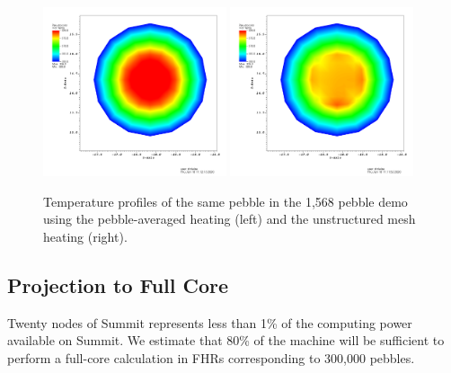 \begin{figure}[!h]
\centering
\includegraphics[clip=true,width=0.48\textwidth]{Figures/openmc_cell_temperature_zoomed}
\includegraphics[clip=true,width=0.48\textwidth]{Figures/openmc_mesh_temperature_zoomed}
\caption{Temperature profiles of the same pebble in the 1,568 pebble demo using the pebble-averaged heating (left) and the unstructured mesh heating (right).}
\label{f:1568_openmc_temperatures_single_pebble}
\end{figure}

\subsection{Projection to Full Core}

Twenty nodes of Summit represents less than 1\% of the computing power available on Summit. We estimate that 80\% of the machine will be sufficient to perform a full-core calculation in FHRs corresponding to 300,000 pebbles.

